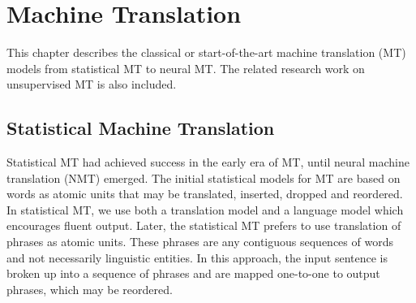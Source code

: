 \chapter{Machine Translation}
This chapter describes the classical or start-of-the-art machine translation  (MT) models from statistical MT to neural MT. The related research work on unsupervised MT is also included.


\section{Statistical Machine Translation}
%
%
Statistical MT had achieved success in the early era of MT, until neural machine translation (NMT) emerged. The initial statistical models for MT are based on words as atomic units that may be translated, inserted, dropped and reordered. In statistical MT, we use both a translation model and a language model which encourages fluent output. Later, the statistical MT prefers to use translation of phrases as atomic units. These phrases are any contiguous sequences of words and not necessarily linguistic entities. In this approach, the input sentence is broken up into a sequence of phrases and are mapped one-to-one to output phrases, which may be reordered.

